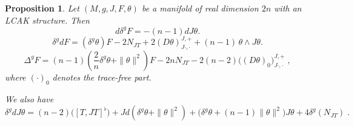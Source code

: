 \documentclass[a4paper,11pt]{amsart}
\newtheorem{prop}[thm]{Proposition}
\theoremstyle{definition}
\renewcommand{\[}{\begin{equation*}}
\renewcommand{\]}{\end{equation*}}
\begin{document}
\begin{prop} \label{coexactform}
Let $(M, g, J, F, \theta)$ be a manifold of real dimension $2n$ with an LCAK structure.
Then
\begin{equation} \label{ddelF}
d \delta^g F = -(n-1) d J \theta.
\end{equation}
\begin{equation} \label{deldF}
\delta^g d  F =  (\delta^g \theta ) F - 2 N_{JT} + 2(D \theta)^{J,+}_{J\cdot,\cdot} + (n-1)\, \theta \wedge J\theta. 
\end{equation}
\begin{equation} \label{DeltaF}
\Delta^g F = (n-1) \left(\frac{2}{n} \delta^g \theta + \| \theta \|^2\right) F - 2n N_{JT}  - 2(n-2) \big( (D \theta)_0 \big)^{J,+}_{J\cdot,\cdot} \; ,
\end{equation}
where $(\cdot)_{0}$ denotes the trace-free part.  

\noindent We also have
\begin{equation} \label{deldJtheta}
\delta^g d J\theta = (n-2) \big( [T, JT]^{\flat} \big)+ J d(\delta^g \theta + \|\theta\|^2) + \big( \delta^g \theta  + (n-1) \|\theta\|^2 \big)J\theta + 4\delta^g (N_{JT})\; .    
\end{equation}
\end{prop}
\end{document}
